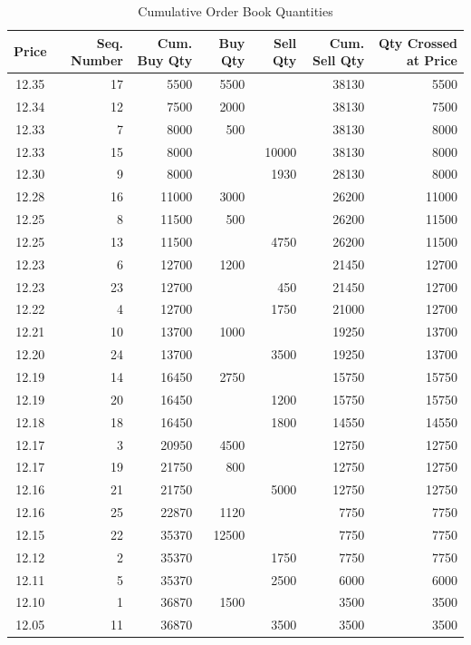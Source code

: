 \begin{table}[!ht]
   \centering
   \caption{Cumulative Order Book Quantities \label{tab:openAuct3}}
   \begin{tabular}{crrrrrr} 
	Price & Seq. Number & Cum. Buy Qty & Buy Qty & Sell Qty & Cum. Sell Qty & Qty Crossed at Price \\ \hline
	12.35 &  17 & 5500  & 5500 &  & 38130 & 5500\\
	12.34 & 12 & 7500 & 2000 & & 38130 & 7500\\	
	12.33 & 7  &  8000 & 500 &  & 38130 & 8000\\	
	12.33 &  15 & 8000 &  & 10000 & 38130 & 8000 \\	
	12.30 & 9 & 8000 & & 1930 & 28130 & 8000 \\					
	12.28 &  16 & 11000  & 3000 &  & 26200 & 11000\\	
	12.25 & 8 &  11500 & 500 & & 26200 & 11500\\	
	12.25 & 13 & 11500 & & 4750 & 26200 & 11500 \\	
	12.23 & 6 &  12700 & 1200 & & 21450 & 12700\\		
	12.23 &  23 & 12700 & & 450 & 21450 & 12700 \\
	12.22 & 4  & 12700 & & 1750 & 21000 & 12700 \\	
	12.21  & 10 & 13700  & 1000 & & 19250 & 13700\\		
	12.20 &  24 & 13700 & & 3500 & 19250 & 13700 \\	
	12.19 &  14 & 16450  & 2750 &  & 15750 & 15750\\		
	12.19 &  20 & 16450 & & 1200 & 15750 & 15750\\
	12.18 &  18 & 16450 & & 1800 & 14550 & 14550 \\
	12.17 & 3  &  20950 & 4500  & & 12750 & 12750\\		
	12.17 &  19 & 21750 & 800 & & 12750 & 12750\\			
	12.16 &  21 & 21750 & & 5000 & 12750 & 12750 \\
	12.16 &  25 & 22870 & 1120 & & 7750 & 7750\\		
	12.15  &  22 & 35370 & 12500 & & 7750 & 7750\\
	12.12  & 2  & 35370 & & 1750 & 7750 & 7750 \\		
	12.11  & 5  & 35370 & & 2500 & 6000 & 6000 \\				
	12.10 & 1  &  36870 & 1500 & & 3500 & 3500 \\
	12.05  & 11 & 36870 & & 3500 & 3500 & 3500 	
   \end{tabular}
\end{table}



